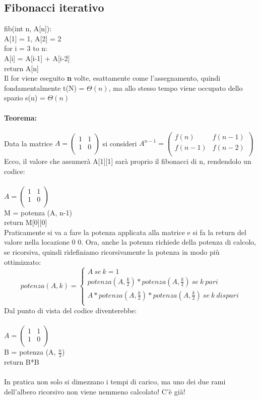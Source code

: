 \documentclass[12pt, a4paper, openany, twoside]{book}
\begin{document}
\subsection{Fibonacci iterativo}
fib(int n, A[n]): \\
	A[1] = 1, A[2] = 2 \\
for i = 3 to n: \\
	A[i] = A[i-1] + A[i-2] \\
return A[n] \\

Il for viene eseguito \textbf{n} volte, esattamente come l'assegnamento, quindi
fondamentalmente t(N) = $\Theta (n)$, ma allo stesso tempo viene occupato dello
spazio s(n) = $\Theta (n)$
\paragraph{Teorema:}
Data la matrice $A = \begin{pmatrix}
1 & 1 \\
1 & 0 \\
\end{pmatrix}$
si consideri $A^{n-1} = 
\begin{pmatrix}
	f(n) & f(n-1) \\
	f(n-1) & f(n-2) \\
\end{pmatrix}$
Ecco, il valore che assumerà A[1][1] sarà proprio il fibonacci di n, rendendolo un
codice:\\ \\
$A = \begin{pmatrix}
1 & 1 \\
1 & 0 \\
\end{pmatrix}$\\
M = potenza (A, n-1)\\
return M[0][0]\\
Praticamente si va a fare la potenza applicata alla matrice e si fa la return
del valore nella locazione 0 0. Ora, anche la potenza richiede della potenza di 
calcolo, se ricorsiva, quindi ridefiniamo ricorsivamente la potenza in modo più
ottimizzato:
\[
	potenza (A, k) = 
	\begin{cases}
		A ~ se ~ k = 1 \\
		potenza (A, \frac{k}{2}) * potenza (A, \frac{k}{2}) ~ se ~ k ~ pari \\
		A * potenza (A, \frac{k}{2}) * potenza (A, \frac{k}{2}) ~ se ~ k ~ dispari \\
	\end{cases}
\]
Dal punto di vista del codice diventerebbe:\\
\\
$A = \begin{pmatrix}
1 & 1 \\
1 & 0 \\
\end{pmatrix}$\\
B = potenza (A, $\frac{n}{2}$)\\
return B*B\\ \\
In pratica non solo si dimezzano i tempi di carico, ma uno dei due rami dell'albero
ricorsivo non viene nemmeno calcolato! C'è già!
\end{document}
